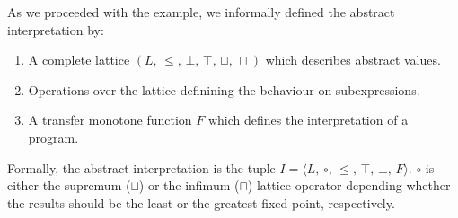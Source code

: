 As we proceeded with the example, we informally defined the abstract
interpretation by:
\begin{enumerate}
\item A complete lattice $(L,\, \leq,\, \bot,\, \top,\, \sqcup,\, \sqcap)$
which describes abstract values.

\item Operations over the lattice definining the behaviour on subexpressions.

\item A transfer monotone function $F$ which defines the interpretation
of a program.

\end{enumerate}
Formally, the abstract interpretation is the tuple $I=\langle L,\, \circ,\,
\leq,\, \top,\, \bot,\, F\rangle$. $\circ$ is either the supremum ($\sqcup$)
or the infimum ($\sqcap$) lattice operator depending whether the results
should be the least or the greatest fixed point, respectively.

